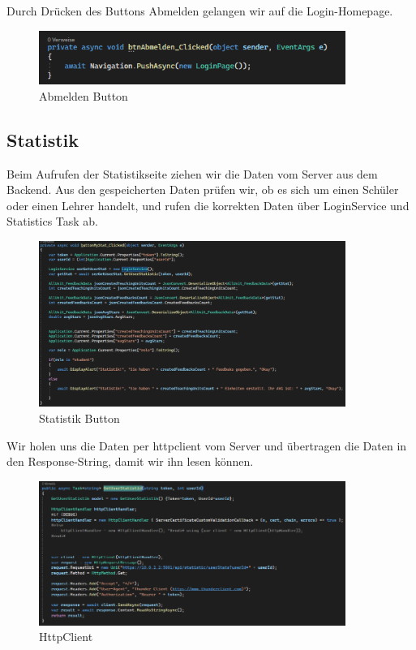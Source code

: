 \newline
Durch Drücken des Buttons Abmelden gelangen wir auf die Login-Homepage.
\begin{figure}[h]
    \begin{center}\includegraphics[width=10cm]{pics/Xamarin Frontend/abmelden.png}
    \caption[MyAccount]{Abmelden Button}
    \end{center}
\end{figure}
\newpage

\subsection{Statistik}
Beim Aufrufen der Statistikseite ziehen wir die Daten vom Server aus dem Backend.
Aus den gespeicherten Daten prüfen wir, ob es sich um einen Schüler oder einen Lehrer handelt, und rufen die korrekten Daten über LoginService und Statistics Task ab.
\begin{figure}[h]
    \begin{center}\includegraphics[width=10cm]{pics/Xamarin Frontend/statistic.png}
    \caption[Statistik]{Statistik Button}
    \end{center}
\end{figure}
\newline
Wir holen uns die Daten per httpclient vom Server und übertragen die Daten in den Response-String, damit wir ihn lesen können.
\begin{figure}[h]
    \begin{center}\includegraphics[width=10cm]{pics/Xamarin Frontend/stat http.png}
    \caption[Statistik]{HttpClient}
    \end{center}
\end{figure}
